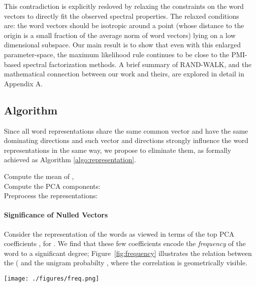 \documentclass{article} \usepackage{acl2017,times}
\begin{document}
This contradiction is  explicitly resloved by relaxing the constraints on the word vectors to directly fit the observed spectral properties.  The relaxed conditions are: the word vectors should be isotropic around a point (whose distance to the origin is a  small fraction of the average norm of word vectors) lying on a low dimensional subspace. Our main result is to show that even with this enlarged parameter-space, the maximum likelihood rule continues to be close to the PMI-based spectral factorization methods.  A brief summary of RAND-WALK, and the mathematical connection between our work and theirs, are explored in detail in Appendix A.





\subsection{Algorithm}
\label{sec:algorithm} Since all word representations share the same common vector  and have the same dominating directions  and such vector and directions strongly influence the word representations in the same way, we propose to eliminate them, as formally achieved as Algorithm \ref{algo:representation}.

\begin{algorithm}[!h]
Compute the mean of ,
  \\
Compute the PCA components:
 \\
Preprocess the representations:
 \\
\caption{Postprocessing algorithm on word representations.}
\label{algo:representation}
\end{algorithm}



\paragraph{Significance of Nulled Vectors}
Consider the representation of the words as viewed in terms of the top  PCA  coefficients , for .    
We  find that  these few coefficients   encode the {\em frequency} of the  word  to a  significant degree;  Figure~\ref{fig:frequency} illustrates the relation between the ( and the unigram  probabilty , where the correlation is geometrically visible.


\begin{figure*}[!h]
  \centering
  \vspace{-10pt}
  \texttt{[image: ./figures/freq.png]}
  \vspace{-20pt}
  \caption{The top two PCA directions (i.e,  and ) encode   frequency.}
  \vspace{-10pt}
  \label{fig:frequency}
\end{figure*}
\end{document}
